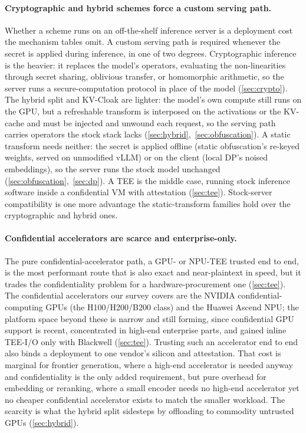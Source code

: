 \paragraph{Cryptographic and hybrid schemes force a custom serving path.}
Whether a scheme runs on an off-the-shelf inference server is a deployment cost the mechanism
tables omit. A custom serving path is required whenever the secret is applied during inference,
in one of two degrees. Cryptographic inference is the heavier: it replaces the model's operators,
evaluating the non-linearities through secret sharing, oblivious transfer, or homomorphic
arithmetic, so the server runs a secure-computation protocol in place of the model
(\cref{sec:crypto}). The hybrid split and KV-Cloak are lighter: the model's own compute still
runs on the GPU, but a refreshable transform is interposed on the activations or the KV-cache and
must be injected and unwound each request, so the serving path carries operators the stock stack
lacks (\cref{sec:hybrid},~\cref{sec:obfuscation}). A static transform needs neither: the secret
is applied offline (static obfuscation's re-keyed weights, served on unmodified vLLM) or on the
client (local DP's noised embeddings), so the server runs the stock model unchanged
(\cref{sec:obfuscation},~\cref{sec:dp}). A TEE is the middle case, running stock inference
software inside a confidential VM with attestation (\cref{sec:tee}). Stock-server
compatibility is one more advantage the static-transform families hold over the cryptographic and
hybrid ones.

\paragraph{Confidential accelerators are scarce and enterprise-only.}
The pure confidential-accelerator path, a GPU- or NPU-TEE trusted end to end, is the most
performant route that is also exact and near-plaintext in speed, but it trades the confidentiality
problem for a hardware-procurement one (\cref{sec:tee}). The confidential accelerators our
survey covers are the NVIDIA confidential-computing GPUs (the H100/H200/B200 class) and the
Huawei Ascend NPU; the platform space beyond these is narrow and still forming, since confidential GPU
support is recent, concentrated in high-end enterprise parts, and gained inline TEE-I/O only with
Blackwell (\cref{sec:tee}). Trusting such an accelerator end to end also binds a deployment to
one vendor's silicon and attestation. That cost is marginal for frontier generation,
where a high-end accelerator is needed anyway and confidentiality is the only added requirement,
but pure overhead for embedding or reranking, where a small encoder needs no high-end accelerator
yet no cheaper confidential accelerator exists to match the smaller workload. The scarcity is what the hybrid
split sidesteps by offloading to commodity untrusted GPUs (\cref{sec:hybrid}).

